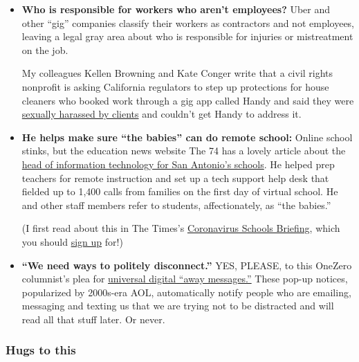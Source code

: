 \begin{itemize}
\item
  \textbf{Who is responsible for workers who aren't employees?} Uber and
  other ``gig'' companies classify their workers as contractors and not
  employees, leaving a legal gray area about who is responsible for
  injuries or mistreatment on the job.

  My colleagues Kellen Browning and Kate Conger write that a civil
  rights nonprofit is asking California regulators to step up
  protections for house cleaners who booked work through a gig app
  called Handy and said they were
  \href{https://www.nytimes3xbfgragh.onion/2020/09/10/business/handy-service-cleaners-harassment.html}{sexually
  harassed by clients} and couldn't get Handy to address it.
\item
  \textbf{He helps make sure ``the babies'' can do remote school:}
  Online school stinks, but the education news website The 74 has a
  lovely article about the
  \href{https://www.the74million.org/article/from-i-t-guy-to-mvp-the-pandemic-thrusts-san-antonio-isds-ken-thompson-into-the-center-of-the-action/}{head
  of information technology for San Antonio's schools}. He helped prep
  teachers for remote instruction and set up a tech support help desk
  that fielded up to 1,400 calls from families on the first day of
  virtual school. He and other staff members refer to students,
  affectionately, as ``the babies.''

  (I first read about this in The Times's
  \href{https://www.nytimes3xbfgragh.onion/2020/09/09/us/schools-reopening-coronavirus.html}{Coronavirus
  Schools Briefing}, which you should
  \href{https://www.nytimes3xbfgragh.onion/newsletters/coronavirus-schools-briefing}{sign
  up} for!)
\item
  \textbf{``We need ways to politely disconnect.''} YES, PLEASE, to this
  OneZero columnist's plea for
  \href{https://onezero.medium.com/now-is-the-time-to-bring-back-away-messages-d53b3fcf0af3}{universal
  digital ``away messages.''} These pop-up notices, popularized by
  2000s-era AOL, automatically notify people who are emailing, messaging
  and texting us that we are trying not to be distracted and will read
  all that stuff later. Or never.
\end{itemize}

\hypertarget{hugs-to-this}{%
\subsubsection{Hugs to this}\label{hugs-to-this}}

